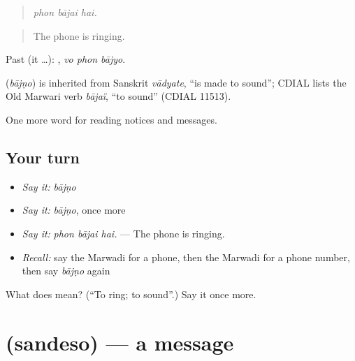 \begin{quote}
  
\end{quote}

\begin{quote}
\emph{phon bājai hai.}
\end{quote}

\begin{quote}
The phone is ringing.
\end{quote}

Past (it …):   , \emph{vo phon bājyo}.

\begin{cousinweb}
\textbf{} (\emph{bājṇo}) is inherited from Sanskrit \emph{vādyate}, \textquotedblleft{}is made to sound\textquotedblright{}; CDIAL lists the Old Marwari verb \emph{bājaï}, \textquotedblleft{}to sound\textquotedblright{} (CDIAL 11513).
\end{cousinweb}

\begin{grammarlens}[title={What you've built}]
One more word for reading notices and messages.
\end{grammarlens}

\subsection*{Your turn}
\begin{itemize}
\raggedright
  \item \emph{Say it:} \emph{bājṇo}
  \item \emph{Say it:} \emph{bājṇo}, once more
  \item \emph{Say it:} \emph{phon bājai hai.} — The phone is ringing.
  \item \emph{Recall:} say the Marwadi for a phone, then the Marwadi for a phone number, then say \emph{bājṇo} again
\end{itemize}

\begin{tcolorbox}[breakable,colback=teal!4,colframe=teal!35!black,title={Before you move on}]
What does  mean? (\textquotedblleft{}To ring; to sound\textquotedblright{}.) Say it once more.
\end{tcolorbox}
\section[\texorpdfstring{\mw{संदेसो} (sandeso)}{संदेसो (sandeso)}]{ (sandeso) — a message}

